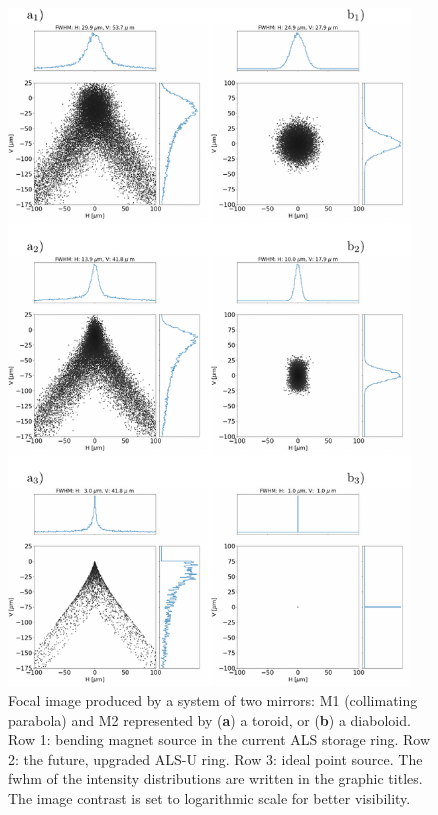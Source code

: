\documentclass{iucr}       %
\begin{document}
\begin{figure}\label{fig:als}
\includegraphics[width=0.95\textwidth]{figures/fig4.pdf}
% 
% 
% 
% 
\caption{Focal image produced by a system of two mirrors: M1 (collimating parabola) and M2 represented by (\textbf{a}) a toroid, or (\textbf{b}) a diaboloid. Row 1: bending magnet source in the current ALS storage ring. Row 2: the future, upgraded ALS-U ring. Row 3: ideal point source. The fwhm of the intensity distributions are written in the graphic titles. The image contrast is set to logarithmic scale for better visibility.
}
\end{figure}
\end{document}
